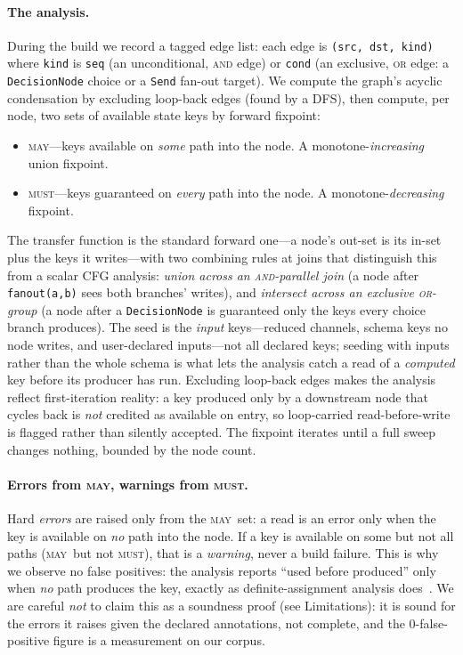 \documentclass[11pt]{article}
\newcommand{\may}{\textsc{may}}
\newcommand{\must}{\textsc{must}}
\newcommand{\code}[1]{\texttt{#1}}
\begin{document}
\paragraph{The analysis.} During the build we record a tagged edge list:
each edge is \code{(src, dst, kind)} where \code{kind} is \code{seq} (an
unconditional, \textsc{and} edge) or \code{cond} (an exclusive, \textsc{or} edge:
a \code{DecisionNode} choice or a \code{Send} fan-out target). We compute the
graph's acyclic condensation by excluding loop-back edges (found by a DFS), then
compute, per node, two sets of available state keys by forward fixpoint:
\begin{itemize}[noitemsep,topsep=2pt]
  \item \may---keys available on \emph{some} path into the node. A
  monotone-\emph{increasing} union fixpoint.
  \item \must---keys guaranteed on \emph{every} path into the node. A
  monotone-\emph{decreasing} fixpoint.
\end{itemize}
The transfer function is the standard forward one---a node's out-set is its
in-set plus the keys it writes---with two combining rules at joins that
distinguish this from a scalar CFG analysis:
\emph{union across an \textsc{and}-parallel join} (a node after \code{fanout(a,b)}
sees both branches' writes), and \emph{intersect across an exclusive
\textsc{or}-group} (a node after a \code{DecisionNode} is guaranteed only the keys
every choice branch produces). The seed is the \emph{input} keys---reduced
channels, schema keys no node writes, and user-declared inputs---not all declared
keys; seeding with inputs rather than the whole schema is what lets the analysis
catch a read of a \emph{computed} key before its producer has run. Excluding
loop-back edges makes the analysis reflect first-iteration reality: a key
produced only by a downstream node that cycles back is \emph{not} credited as
available on entry, so loop-carried read-before-write is flagged rather than
silently accepted. The fixpoint iterates until a full sweep changes nothing,
bounded by the node count.

\paragraph{Errors from \may, warnings from \must.} Hard \emph{errors} are raised
only from the \may\ set: a read is an error only when the key is available on
\emph{no} path into the node. If a key is available on some but not all paths
(\may\ but not \must), that is a \emph{warning}, never a build failure. This is
why we observe no false positives: the analysis reports ``used before produced''
only when \emph{no} path produces the key, exactly as definite-assignment
analysis does~\citep{jls,nielson}. We are careful \emph{not} to claim this as a
soundness proof (see Limitations): it is sound for the errors it raises given the
declared annotations, not complete, and the 0-false-positive figure is a
measurement on our corpus.
\end{document}
